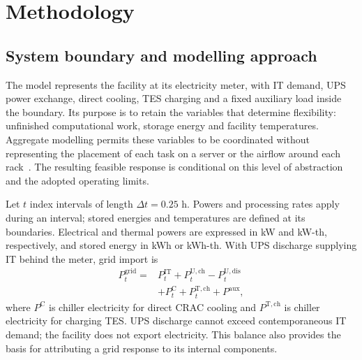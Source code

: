 \section{Methodology}
\label{sec:methodology}
\subsection{System boundary and modelling approach}
The model represents the facility at its electricity meter, with IT demand, UPS power exchange, direct cooling, TES charging and a fixed auxiliary load inside the boundary. Its purpose is to retain the variables that determine flexibility: unfinished computational work, storage energy and facility temperatures. Aggregate modelling permits these variables to be coordinated without representing the placement of each task on a server or the airflow around each rack~\cite{barroso2018datacenter,dayarathna2015data}. The resulting feasible response is conditional on this level of abstraction and the adopted operating limits.

Let $t$ index intervals of length $\Delta t=0.25$ h. Powers and processing rates apply during an interval; stored energies and temperatures are defined at its boundaries. Electrical and thermal powers are expressed in kW and kW-th, respectively, and stored energy in kWh or kWh-th. With UPS discharge supplying IT behind the meter, grid import is
\begin{equation}
\begin{split}
P_t^{\mathrm{grid}}={}&P_t^{\mathrm{IT}}+P_t^{\mathrm{U,ch}}-P_t^{\mathrm{U,dis}}\\
&+P_t^{\mathrm{C}}+P_t^{\mathrm{T,ch}}+P^{\mathrm{aux}},
\end{split}
\label{eq:grid}
\end{equation}
where $P^{\mathrm{C}}$ is chiller electricity for direct CRAC cooling and $P^{\mathrm{T,ch}}$ is chiller electricity for charging TES. UPS discharge cannot exceed contemporaneous IT demand; the facility does not export electricity. This balance also provides the basis for attributing a grid response to its internal components.

